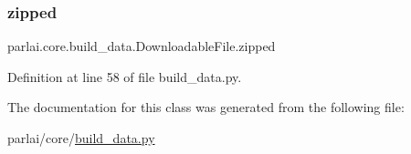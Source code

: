 \subsubsection{\texorpdfstring{zipped}{zipped}}
{\footnotesize\ttfamily parlai.\+core.\+build\+\_\+data.\+Downloadable\+File.\+zipped}



Definition at line 58 of file build\+\_\+data.\+py.



The documentation for this class was generated from the following file\+:\begin{DoxyCompactItemize}
\item 
parlai/core/\hyperlink{build__data_8py}{build\+\_\+data.\+py}\end{DoxyCompactItemize}
